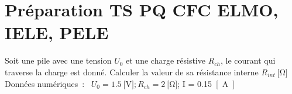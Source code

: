 \documentclass[a4paper,11pt,answers,addpoints]{exam}
\begin{document}
	
	
	\unframedsolutions
	\pointsinmargin
	\bracketedpoints
	\section*{Préparation TS PQ CFC ELMO, IELE, PELE}
	\begin{questions}

\question[6]
Soit une pile avec une tension $U_0$ et une charge résistive $R_{ch}$, le courant qui traverse la charge est donné. Calculer la valeur de sa résistance interne $R_{int} \qty{}{[\ohm]}$\\
Données numériques~: \ $U_0 = \qty{1.5}{[\volt]}; R_{ch} = \qty{2}{[\ohm]}$; I = \qty{0.15}{[\ampere]}\\
\vspace*{0.5cm}
\begin{center}
\end{center}
\end{questions}
\end{document}
